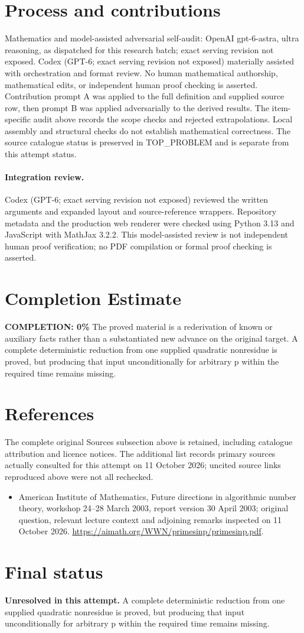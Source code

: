 \documentclass[11pt]{article}
\begin{document}
\section{Process and contributions}
Mathematics and model-assisted adversarial self-audit: OpenAI gpt-6-astra, ultra reasoning, as dispatched for this research batch; exact serving revision not exposed. Codex (GPT-6; exact serving revision not exposed) materially assisted with orchestration and format review. No human mathematical authorship, mathematical edits, or independent human proof checking is asserted.
Contribution prompt A was applied to the full definition and supplied source row, then prompt B was applied adversarially to the derived results. The item-specific audit above records the scope checks and rejected extrapolations. Local assembly and structural checks do not establish mathematical correctness. The source catalogue status is preserved in TOP\_PROBLEM and is separate from this attempt status.
\paragraph{Integration review.} Codex (GPT-6; exact serving revision not exposed) reviewed the written arguments and expanded layout and source-reference wrappers. Repository metadata and the production web renderer were checked using Python 3.13 and JavaScript with MathJax 3.2.2. This model-assisted review is not independent human proof verification; no PDF compilation or formal proof checking is asserted.

\section{Completion Estimate}
\noindent\textbf{COMPLETION: 0\%}
The proved material is a rederivation of known or auxiliary facts rather than a substantiated new advance on the original target. A complete deterministic reduction from one supplied quadratic nonresidue is proved, but producing that input unconditionally for arbitrary p within the required time remains missing.
\section{References}
The complete original Sources subsection above is retained, including catalogue attribution and licence notices. The additional list records primary sources actually consulted for this attempt on 11 October 2026; uncited source links reproduced above were not all rechecked.
\begin{itemize}
\item American Institute of Mathematics, Future directions in algorithmic number theory, workshop 24--28 March 2003, report version 30 April 2003; original question, relevant lecture context and adjoining remarks inspected on 11 October 2026. \url{https://aimath.org/WWN/primesinp/primesinp.pdf}.
\end{itemize}
\section{Final status}
\textbf{Unresolved in this attempt.} A complete deterministic reduction from one supplied quadratic nonresidue is proved, but producing that input unconditionally for arbitrary p within the required time remains missing.
\end{document}
